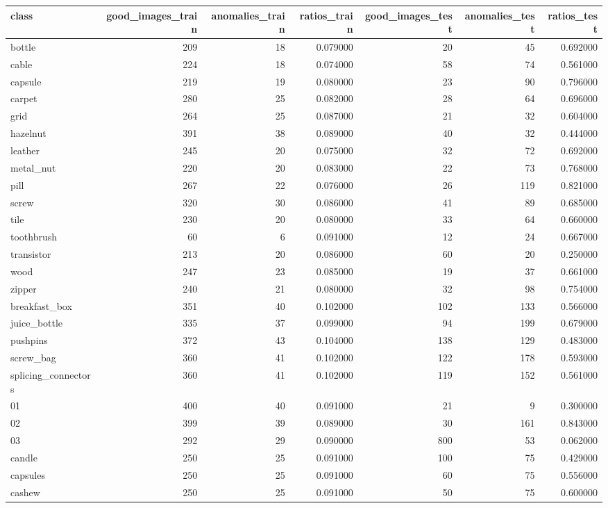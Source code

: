 \begin{tabular}{lrrrrrr}
\toprule
class & good_images_train & anomalies_train & ratios_train & good_images_test & anomalies_test & ratios_test \\
\midrule
bottle & 209 & 18 & 0.079000 & 20 & 45 & 0.692000 \\
cable & 224 & 18 & 0.074000 & 58 & 74 & 0.561000 \\
capsule & 219 & 19 & 0.080000 & 23 & 90 & 0.796000 \\
carpet & 280 & 25 & 0.082000 & 28 & 64 & 0.696000 \\
grid & 264 & 25 & 0.087000 & 21 & 32 & 0.604000 \\
hazelnut & 391 & 38 & 0.089000 & 40 & 32 & 0.444000 \\
leather & 245 & 20 & 0.075000 & 32 & 72 & 0.692000 \\
metal_nut & 220 & 20 & 0.083000 & 22 & 73 & 0.768000 \\
pill & 267 & 22 & 0.076000 & 26 & 119 & 0.821000 \\
screw & 320 & 30 & 0.086000 & 41 & 89 & 0.685000 \\
tile & 230 & 20 & 0.080000 & 33 & 64 & 0.660000 \\
toothbrush & 60 & 6 & 0.091000 & 12 & 24 & 0.667000 \\
transistor & 213 & 20 & 0.086000 & 60 & 20 & 0.250000 \\
wood & 247 & 23 & 0.085000 & 19 & 37 & 0.661000 \\
zipper & 240 & 21 & 0.080000 & 32 & 98 & 0.754000 \\
breakfast_box & 351 & 40 & 0.102000 & 102 & 133 & 0.566000 \\
juice_bottle & 335 & 37 & 0.099000 & 94 & 199 & 0.679000 \\
pushpins & 372 & 43 & 0.104000 & 138 & 129 & 0.483000 \\
screw_bag & 360 & 41 & 0.102000 & 122 & 178 & 0.593000 \\
splicing_connectors & 360 & 41 & 0.102000 & 119 & 152 & 0.561000 \\
01 & 400 & 40 & 0.091000 & 21 & 9 & 0.300000 \\
02 & 399 & 39 & 0.089000 & 30 & 161 & 0.843000 \\
03 & 292 & 29 & 0.090000 & 800 & 53 & 0.062000 \\
candle & 250 & 25 & 0.091000 & 100 & 75 & 0.429000 \\
capsules & 250 & 25 & 0.091000 & 60 & 75 & 0.556000 \\
cashew & 250 & 25 & 0.091000 & 50 & 75 & 0.600000 \\

\end{tabular}
